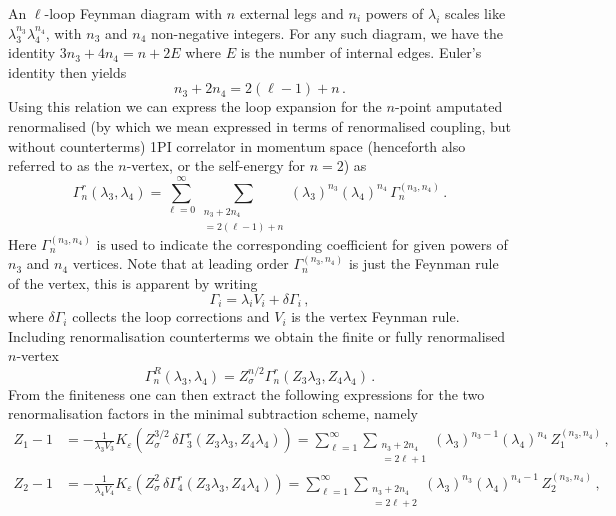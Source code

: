 \documentclass[a4paper,11pt]{article}
\begin{document}
An $\ell$-loop Feynman diagram with $n$ external legs and $n_i$ powers of $\lambda_i$ scales like $\lambda_3^{n_3}\lambda_4^{n_4}$, with $n_3$ and $n_4$ non-negative integers. For any such diagram, we have the identity $3n_3+4n_4=n+2E$ where $E$ is the number of internal edges. Euler's identity then yields
\begin{equation}\label{eq:numberoflegsforloops}
    n_3 + 2n_4 = 2(\ell-1) + n\,.
\end{equation}
Using this relation we can express the loop expansion for the $n$-point amputated renormalised (by which we mean expressed in terms of renormalised coupling, but without counterterms) 1PI correlator in momentum space (henceforth also referred to as the $n$-vertex, or the self-energy for $n=2$) as
\begin{equation}\label{eq:Gamma_loop_expansion}
    \Gamma_n^r (\lambda_3,\lambda_4) = \sum_{\ell=0}^{\infty} \sum_{\substack{n_3 + 2n_4 \\ = 2(\ell-1) +n}} \left(\lambda_3\right)^{n_3}\left(\lambda_4\right)^{n_4}\,\Gamma_n^{(n_3,n_4)} \,.
\end{equation}
Here $\Gamma_n^{(n_3,n_4)}$ is used to indicate the corresponding coefficient for given powers of $n_3$ and $n_4$ vertices. Note that at leading order $\Gamma_n^{(n_3,n_4)}$ is just the Feynman rule of the vertex, this is apparent by writing   
\begin{equation}
    \Gamma_i=\lambda_iV_i+ \delta\Gamma_i\,,
\end{equation}
where $\delta\Gamma_i$ collects the loop corrections and $V_i$ is the vertex Feynman rule. Including renormalisation counterterms we obtain the finite or fully renormalised $n$-vertex 
\begin{equation}\label{eq:bare_correlator}
\Gamma_n^R (\lambda_3,\lambda_4) = Z_\sigma^{n/2} \Gamma_n^r (Z_3\lambda_3,Z_4\lambda_4)\,.
\end{equation}
From the finiteness one can then extract the following expressions for the two renormalisation factors in the minimal subtraction scheme, namely 
\begin{align}
\label{eq:deltaZ1}
    Z_1  - 1&=-\frac{1}{\lambda_3 V_3} K_\varepsilon \left( Z^{3/2}_\sigma\, \delta\Gamma_3^r(Z_3\lambda_3,Z_4\lambda_4)\right)= \sum_{\ell=1}^{\infty} \sum_{\substack{n_3 + 2n_4 \\ = 2\ell+1}} \left(\lambda_3\right)^{n_3-1}\left(\lambda_4\right)^{n_4}\,Z_1^{(n_3,n_4)}\,,\\
    \label{eq:deltaZ2}
    Z_2 -1  &=-\frac{1}{\lambda_4 V_4} K_\varepsilon \left( Z^{2}_\sigma \, \delta\Gamma_4^r(Z_3\lambda_3,Z_4\lambda_4)\right)= \sum_{\ell=1}^{\infty} \sum_{\substack{n_3 + 2n_4 \\ = 2\ell+2}} \left(\lambda_3\right)^{n_3}\left(\lambda_4\right)^{n_4-1}\,Z_2^{(n_3,n_4)}\,,
\end{align}
\end{document}
